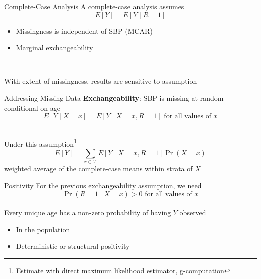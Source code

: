 \documentclass{beamer}
\begin{document}
\begin{frame}{Complete-Case Analysis}
	A complete-case analysis assumes
	{\Large $$ E[Y] = E[Y \mid R=1] $$}
	\begin{itemize}
		\item Missingness is independent of SBP (MCAR)
		\item Marginal exchangeability
	\end{itemize}
	~\\
	\begin{center}
	\end{center}
	With extent of missingness, results are sensitive to assumption
\end{frame}

\begin{frame}{Addressing Missing Data}
	\textbf{Exchangeability}: SBP is missing at random conditional on age
	\begin{equation*}
		E[Y \mid X=x] = E[Y \mid X=x, R=1] \text{ for all values of } x
	\end{equation*}
	\begin{center}
	\end{center}
	~\\
	Under this assumption\footnote[frame]{Estimate with direct maximum likelihood estimator, g-computation}
	\begin{equation*}
		E[Y] = \sum_{x \in \mathcal{X}} E[Y \mid X=x, R=1] \Pr(X=x)
	\end{equation*}
	weighted average of the complete-case means within strata of $X$
\end{frame}

\begin{frame}{Positivity}
	For the previous exchangeability assumption, we need
	$$ \Pr(R=1 \mid X=x) > 0 \text{ for all values of } x $$
	~\\
	Every unique age has a non-zero probability of having $Y$ observed
	\begin{itemize}
		\item In the population
		\item Deterministic or structural positivity
	\end{itemize}
\end{frame}
\end{document}

